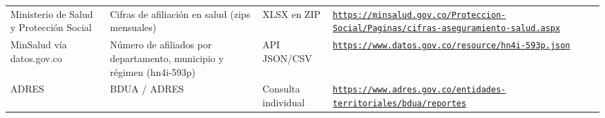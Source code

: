 \documentclass[11pt,letterpaper]{article}
\begin{document}
{\begin{xltabular}{\linewidth}{L{2.8cm}YL{1.6cm}Y}
Ministerio de Salud y Protección Social & Cifras de afiliación en salud (zips mensuales) & XLSX en ZIP & \texttt{\footnotesize \href{https://minsalud.gov.co/Proteccion-Social/Paginas/cifras-aseguramiento-salud.aspx}{https:/\allowbreak{}}\allowbreak{}\href{https://minsalud.gov.co/Proteccion-Social/Paginas/cifras-aseguramiento-salud.aspx}{/\allowbreak{}}\allowbreak{}\href{https://minsalud.gov.co/Proteccion-Social/Paginas/cifras-aseguramiento-salud.aspx}{minsalud.\allowbreak{}gov.\allowbreak{}co/\allowbreak{}}\allowbreak{}\href{https://minsalud.gov.co/Proteccion-Social/Paginas/cifras-aseguramiento-salud.aspx}{Proteccion-\allowbreak{}Social/\allowbreak{}}\allowbreak{}\href{https://minsalud.gov.co/Proteccion-Social/Paginas/cifras-aseguramiento-salud.aspx}{Paginas/\allowbreak{}}\allowbreak{}\href{https://minsalud.gov.co/Proteccion-Social/Paginas/cifras-aseguramiento-salud.aspx}{cifras-\allowbreak{}aseguramiento-\allowbreak{}salud.\allowbreak{}aspx}} \\
MinSalud vía datos.\allowbreak{}gov.\allowbreak{}co & Número de afiliados por departamento, municipio y régimen (hn4i-593p) & API JSON/\allowbreak{}CSV & \texttt{\footnotesize \href{https://www.datos.gov.co/resource/hn4i-593p.json}{https:/\allowbreak{}}\allowbreak{}\href{https://www.datos.gov.co/resource/hn4i-593p.json}{/\allowbreak{}}\allowbreak{}\href{https://www.datos.gov.co/resource/hn4i-593p.json}{www.\allowbreak{}datos.\allowbreak{}gov.\allowbreak{}co/\allowbreak{}}\allowbreak{}\href{https://www.datos.gov.co/resource/hn4i-593p.json}{resource/\allowbreak{}}\allowbreak{}\href{https://www.datos.gov.co/resource/hn4i-593p.json}{hn4i-\allowbreak{}593p.\allowbreak{}json}} \\
ADRES & BDUA /\allowbreak{} ADRES & Consulta individual & \texttt{\footnotesize \href{https://www.adres.gov.co/entidades-territoriales/bdua/reportes}{https:/\allowbreak{}}\allowbreak{}\href{https://www.adres.gov.co/entidades-territoriales/bdua/reportes}{/\allowbreak{}}\allowbreak{}\href{https://www.adres.gov.co/entidades-territoriales/bdua/reportes}{www.\allowbreak{}adres.\allowbreak{}gov.\allowbreak{}co/\allowbreak{}}\allowbreak{}\href{https://www.adres.gov.co/entidades-territoriales/bdua/reportes}{entidades-\allowbreak{}territoriales/\allowbreak{}}\allowbreak{}\href{https://www.adres.gov.co/entidades-territoriales/bdua/reportes}{bdua/\allowbreak{}}\allowbreak{}\href{https://www.adres.gov.co/entidades-territoriales/bdua/reportes}{reportes}} \\

\end{xltabular}}
\end{document}
